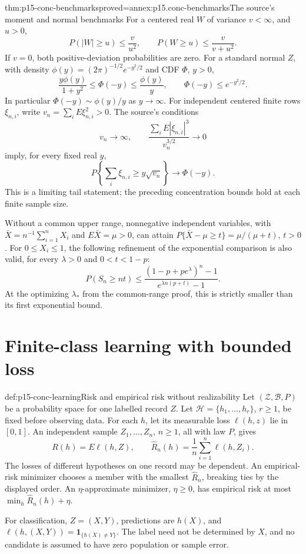 \begin{hbtheorem}{thm:p15-conc-benchmarks}{proved=annex:p15.conc-benchmarks}{The source's moment and normal benchmarks}
For a centered real \(W\) of variance \(v<\infty\), and \(u>0\),
\[
 P(|W|\geq u)\leq\frac{v}{u^2},\qquad
 P(W\geq u)\leq\frac{v}{v+u^2}.
\]
If \(v=0\), both positive-deviation probabilities are zero.
For a standard normal \(Z\), with density
\(\phi(y)=(2\pi)^{-1/2}e^{-y^2/2}\) and CDF \(\Phi\), \(y>0\),
\[
 \frac{y\phi(y)}{1+y^2}\leq\Phi(-y)\leq\frac{\phi(y)}y,
 \qquad \Phi(-y)\leq e^{-y^2/2}.
\]
In particular \(\Phi(-y)\sim\phi(y)/y\) as \(y\to\infty\).
For independent centered finite rows \(\xi_{n,i}\), write
\(v_n=\sum_iE\xi_{n,i}^2>0\). The source's conditions
\[
 v_n\longrightarrow\infty,\qquad
 \frac{\sum_iE|\xi_{n,i}|^3}{v_n^{3/2}}\longrightarrow0
\]
imply, for every fixed real \(y\),
\[
             P\left\{\sum_i\xi_{n,i}\geq y\sqrt{v_n}\right\}
                                  \longrightarrow\Phi(-y).
\]
This is a limiting tail statement; the preceding concentration
bounds hold at each finite sample size.

Without a common upper range, nonnegative independent variables,
with \(\bar X=n^{-1}\sum_{i=1}^nX_i\) and \(E\bar X=\mu>0\), can attain
\(P\{\bar X-\mu\geq t\}=\mu/(\mu+t)\), \(t>0\).
For \(0\leq X_i\leq1\), the following refinement of the
exponential comparison is also valid, for every \(\lambda>0\)
and \(0<t<1-p\):
\[
 P(S_n\geq nt)\leq
 \frac{(1-p+pe^\lambda)^n-1}
      {e^{\lambda n(p+t)}-1}.
\]
At the optimizing \(\lambda_*\) from the common-range proof,
this is strictly smaller than its first exponential bound.
\end{hbtheorem}

\section{Finite-class learning with bounded loss}

\begin{hbdefinition}{def:p15-conc-learning}{Risk and empirical risk without realizability}
Let \((\mathcal Z,\mathcal B,P)\) be a probability space for one
labelled record \(Z\). Let \(\mathcal H=\{h_1,\ldots,h_r\}\),
\(r\geq1\), be fixed before observing data. For each \(h\),
let its measurable loss \(\ell(h,z)\) lie in \([0,1]\).
An independent sample \(Z_1,\ldots,Z_n\), \(n\geq1\), all with law \(P\), gives
\[
 R(h)=E\ell(h,Z),\qquad
 \widehat R_n(h)=\frac1n\sum_{i=1}^n\ell(h,Z_i).
\]
The losses of different hypotheses on one record may be dependent.
An empirical-risk minimizer chooses a member with the smallest
\(\widehat R_n\), breaking ties by the displayed order.
An \(\eta\)-approximate minimizer, \(\eta\geq0\), has empirical
risk at most \(\min_h\widehat R_n(h)+\eta\).

For classification, \(Z=(X,Y)\), predictions are \(h(X)\),
and \(\ell(h,(X,Y))=\mathbf1_{\{h(X)\ne Y\}}\).
The label need not be determined by \(X\), and no candidate
is assumed to have zero population or sample error.
\end{hbdefinition}


